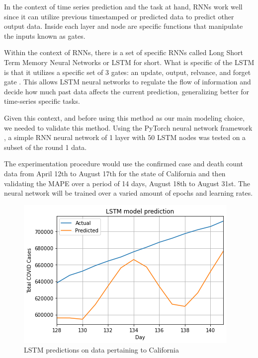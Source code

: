 \documentclass[sigconf,nonacm]{acmart}
\begin{document}
 In the context of time series prediction and the task at hand, RNNs work well since it can utilize previous timestamped or predicted data to predict other output data. Inside each layer and node are specific functions that manipulate the inputs known as gates.

Within the context of RNNs, there is a set of specific RNNs called Long Short Term Memory Neural Networks or LSTM for short. What is specific of the LSTM is that it utilizes a specific set of 3 gates: an update, output, relvance, and forget gate \cite{LSTMlecture}. This allows LSTM neural networks to regulate the flow of information and decide how much past data affects the current prediction, generalizing better for time-series specific tasks.

Given this context, and before using this method as our main modeling choice, we needed to validate this method. Using the PyTorch neural network framework \cite{Pytorch}, a simple RNN neural network of 1 layer with 50 LSTM nodes was tested on a subset of the round 1 data. 

The experimentation procedure would use the confirmed case and death count data from April 12th to August 17th for the state of California and then validating the MAPE over a period of 14 days, August 18th to August 31st. The neural network will be trained over a varied amount of epochs and learning rates. 

\begin{figure}
  \centering
  \includegraphics[width=\linewidth]{figures/LSTMPytorch.png}
  \caption{LSTM predictions on data pertaining to California}
  \label{fig:LSTM_trial}
\end{figure}
\end{document}
